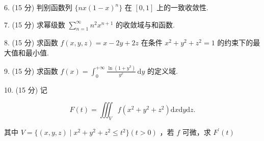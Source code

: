 \documentclass{examcollection}
\renewcommand{\displayformula}[1]{\[#1\]}
\begin{document}
{\begin{minipage}{\textwidth}
6. (15 分) 判别函数列 $\{nx(1 - x)^n\}$ 在 $[0, 1]$ 上的一致收敛性.\par
7. (15 分) 求幂级数 $\sum_{n=1}^{\infty} n^{2} x^{n+1}$ 的收敛域与和函数.\par
8. (15 分) 求函数 $f(x, y, z) = x - 2y + 2z$ 在条件 $x^2 + y^2 + z^2 = 1$ 的约束下的最大值和最小值.\par
9. (15 分) 求函数 $f(x) = \int_{0}^{+\infty} \frac{\ln(1 + y^3)}{y^x} \, \mathrm{d}y$ 的定义域.\par
10. (15 分) 记\par
\displayformula{F (t) = \iiint_ {V} f \left(x ^ {2} + y ^ {2} + z ^ {2}\right) \mathrm{d} x \mathrm{d} y \mathrm{d} z.}\par
其中 $V = \{(x,y,z)\mid x^2 +y^2 +z^2\leq t^2\}$$(t > 0)$ ，若 $f$ 可微，求 $F^{\prime}(t)$\par
\end{minipage}}
\ifdim\dimexpr\ht\proofbox+\dp\proofbox\relax>\textheight
\noindent\resizebox{!}{\textheight}{\usebox{\proofbox}}\else\noindent\usebox{\proofbox}\fi\clearpage
\end{document}
